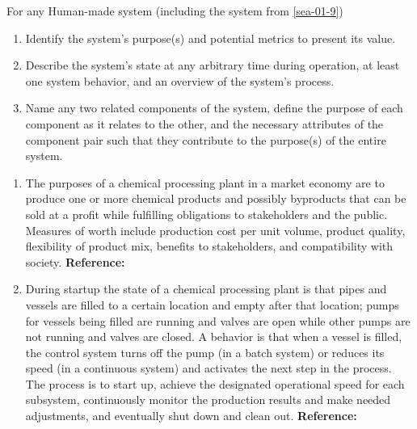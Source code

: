 \begin{exercises}
    \begin{exercise} 
    \label{sea-01-10_11_12}
        For any Human-made system (including the system from \ref{sea-01-9})
        \begin{enumerate}[label=\alph*)]
            \item Identify the system's purpose(s) and potential metrics to present its value.
            \item Describe the system's state at any arbitrary time during operation, at least one system behavior, and an overview of the system's process.
            \item Name any two related components of the system, define the purpose of each component as it relates to the other, and the necessary attributes of the component pair such that they contribute to the purpose(s) of the entire system.
        \end{enumerate}
    \end{exercise}
    \begin{solution}
        \begin{enumerate}[label=\alph*)]
            \item The purposes of a chemical processing plant in a market economy are to produce one or more chemical products and possibly byproducts that can be sold at a profit while fulfilling obligations to stakeholders and the public. Measures of worth include production cost per unit volume, product quality, flexibility of product mix, benefits to stakeholders, and compatibility with society. \textbf{Reference:}
            \item During startup the state of a chemical processing plant is that pipes and vessels are filled to a certain location and empty after that location; pumps for vessels being filled are running and valves are open while other pumps are not running and valves are closed. A behavior is that when a vessel is filled, the control system turns off the pump (in a batch system) or reduces its speed (in a continuous system) and activates the next step in the process. The process is to start up, achieve the designated operational speed for each subsystem, continuously monitor the production results and make needed adjustments, and eventually shut down and clean out. \textbf{Reference:}

\end{enumerate}
\end{solution}
\end{exercises}
